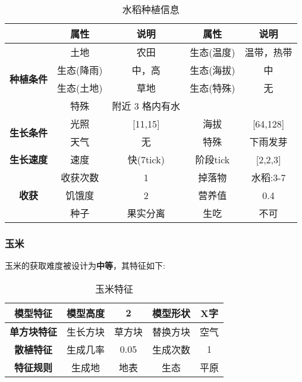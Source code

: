 \begin{table}[H]
    \centering
    \caption{水稻种植信息}
    \label{table:水稻种植信息}
    \setlength{\tabcolsep}{4mm}
    \begin{tabular}{c|cc|cc}
        \toprule
                                           & \textbf{属性} & \textbf{说明}   & \textbf{属性} & \textbf{说明} \\
        \midrule
        \multirow{4}{*}{\textbf{种植条件}} & 土地          & 农田            & 生态(温度)    & 温带，热带    \\
                                           & 生态(降雨)    & 中，高          & 生态(海拔)    & 中            \\
                                           & 生态(土地)    & 草地            & 生态(特殊)    & 无            \\
                                           & 特殊          & 附近 3 格内有水                                 \\
        \midrule
        \multirow{2}{*}{\textbf{生长条件}} & 光照          & [11,15]         & 海拔          & [64,128]      \\
                                           & 天气          & 无              & 特殊          & 下雨发芽      \\
        \midrule
        \textbf{生长速度}                  & 速度          & 快(7tick)       & 阶段tick      & [2,2,3]       \\
        \midrule
        \multirow{3}{*}{\textbf{收获}}     & 收获次数      & 1               & 掉落物        & 水稻:3-7      \\
                                           & 饥饿度        & 2               & 营养值        & 0.4           \\
                                           & 种子          & 果实分离        & 生吃          & 不可          \\
        \bottomrule
    \end{tabular}
\end{table}

\subsubsection{玉米}

玉米的获取难度被设计为\textbf{中等}，其特征如下:
\begin{table}[H]
    \centering
    \caption{玉米特征}
    \label{table:玉米特征}
    \setlength{\tabcolsep}{4mm}
    \begin{tabular}{c|cc|cc}
        \toprule
        \textbf{模型特征}   & 模型高度 & 2      & 模型形状 & X字  \\
        \midrule
        \textbf{单方块特征} & 生长方块 & 草方块 & 替换方块 & 空气 \\
        \midrule
        \textbf{散植特征}   & 生成几率 & 0.05   & 生成次数 & 1    \\
        \midrule
        \textbf{特征规则}   & 生成地   & 地表   & 生态     & 平原 \\
        \bottomrule
    \end{tabular}
\end{table}


